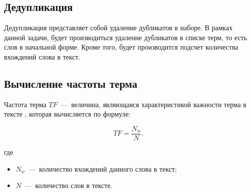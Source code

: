 \subsection{Дедупликация}
Дедупликация представляет собой удаление дубликатов в наборе. В рамках данной задачи, будет производиться удаление дубликатов в списке терм, то есть слов в начальной форме. Кроме того, будет производится подсчет количества вхождений слова в текст.
 
\subsection{Вычисление частоты терма}
Частота терма $TF$~---~величина, являющаяся характеристикой важности терма в тексте \cite{bib:tf}, которая вычисляется по формуле:

\begin{equation}
	TF = \frac{N_w}{N},
\end{equation}

где
\begin{itemize}
	\item $N_w$~---~количество вхождений данного слова в текст;
	\item $N$~---~количество слов в тексте.
\end{itemize}

\newpage